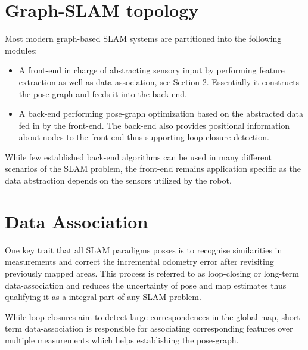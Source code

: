 \section{Graph-SLAM topology}
Most modern graph-based SLAM systems are partitioned into the following modules:
\begin{itemize}
	\item A front-end in charge of abstracting sensory input by performing feature extraction as well as data association, see Section \ref{dataAssociation}. Essentially it constructs the pose-graph and feeds it into the back-end.
	\item A back-end performing pose-graph optimization based on the abstracted data fed in by the front-end. The back-end also provides positional information about nodes to the front-end thus supporting loop closure detection. 
\end{itemize}

While few established back-end algorithms can be used in many different scenarios of the SLAM problem, the front-end remains application specific as the data abstraction depends on the sensors utilized by the robot.


\section{Data Association}\label{dataAssociation}
One key trait that all SLAM paradigms posses is to recognise similarities in measurements and correct the incremental odometry error after revisiting previously mapped areas. This process is referred to as loop-closing or long-term data-association and reduces the uncertainty of pose and map estimates thus qualifying it as a integral part of any SLAM problem. 

While loop-closures aim to detect large correspondences in the global map, short-term data-association is responsible for associating corresponding features over multiple measurements which helps establishing the pose-graph. 

